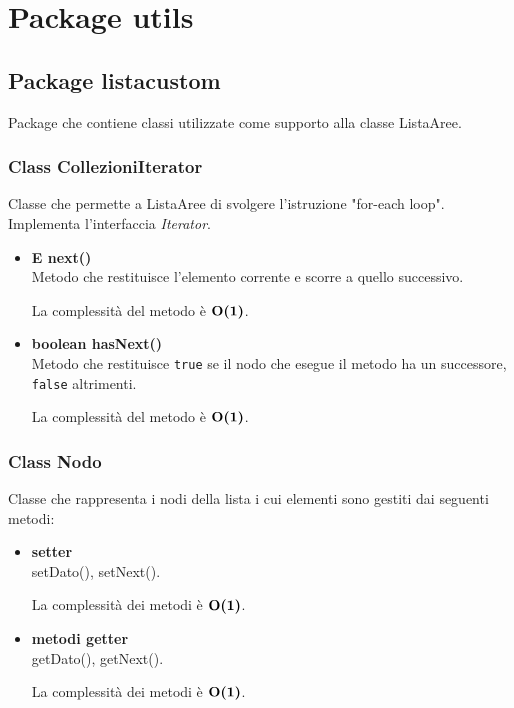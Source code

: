 \documentclass[a4paper, 12pt]{scrreprt}
\begin{document}
		\section{Package utils}
			\subsection{Package listacustom}
			Package che contiene classi utilizzate come supporto alla classe ListaAree.
				\subsubsection{Class CollezioniIterator}
				Classe che permette a ListaAree di svolgere l'istruzione "for-each loop". Implementa l'interfaccia \textsl{Iterator}.
				\begin{itemize}
					\item\textbf{E next()}
					\\Metodo che restituisce l'elemento corrente e scorre a quello successivo.
					
					La complessit\`a del metodo \`e $\mathbf{O}\textbf{(1)}$.
					
					\item\textbf{boolean hasNext()}
					\\Metodo che restituisce \verb!true! se il nodo che esegue il metodo ha un successore, \verb!false! altrimenti.
					
					La complessit\`a del metodo \`e $\mathbf{O}\textbf{(1)}$.
					
				\end{itemize}

				\subsubsection{Class Nodo}
				Classe che rappresenta i nodi della lista i cui elementi sono gestiti dai seguenti metodi:\\
				\begin{itemize}
					\item\textbf{setter}
					\\setDato(), setNext().
					
					La complessit\`a dei metodi \`e $\mathbf{O}\textbf{(1)}$.
					\pagebreak
					\item\textbf{metodi getter}
					\\getDato(), getNext().
					
					La complessit\`a dei metodi \`e $\mathbf{O}\textbf{(1)}$.
					
				\end{itemize}
\end{document}
